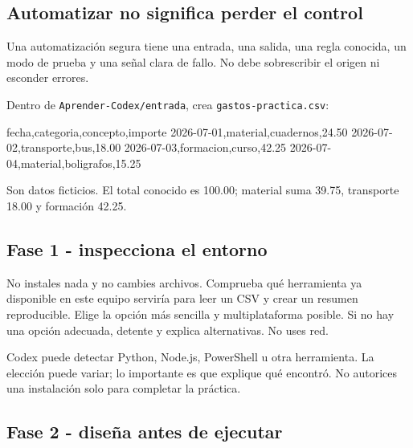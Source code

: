 \documentclass[10pt,a4paper,openany]{book}
\newenvironment{Shaded}{}{}
\newcommand{\NormalTok}[1]{#1}
\renewenvironment{Shaded}
  {\begin{tcolorbox}[
    enhanced,
    breakable,
    colback=CodeBg,
    colframe=Border,
    boxrule=0.5pt,
    arc=2mm,
    left=3mm,
    right=3mm,
    top=2.2mm,
    bottom=2.2mm,
    before skip=0.8em,
    after skip=0.9em
  ]}
  {\end{tcolorbox}}
\begin{document}
\subsection{Automatizar no significa perder el
control}\label{automatizar-no-significa-perder-el-control}

Una automatización segura tiene una entrada, una salida, una regla
conocida, un modo de prueba y una señal clara de fallo. No debe
sobrescribir el origen ni esconder errores.

Dentro de \texttt{Aprender-Codex/entrada}, crea
\texttt{gastos-practica.csv}:

\begin{Shaded}
\begin{Highlighting}[]
\NormalTok{fecha,categoria,concepto,importe}
\NormalTok{2026{-}07{-}01,material,cuadernos,24.50}
\NormalTok{2026{-}07{-}02,transporte,bus,18.00}
\NormalTok{2026{-}07{-}03,formacion,curso,42.25}
\NormalTok{2026{-}07{-}04,material,boligrafos,15.25}
\end{Highlighting}
\end{Shaded}

Son datos ficticios. El total conocido es 100.00; material suma 39.75,
transporte 18.00 y formación 42.25.

\subsection{Fase 1 - inspecciona el
entorno}\label{fase-1---inspecciona-el-entorno}

\begin{Shaded}
\begin{Highlighting}[]
\NormalTok{No instales nada y no cambies archivos. Comprueba qué herramienta ya disponible}
\NormalTok{en este equipo serviría para leer un CSV y crear un resumen reproducible. Elige}
\NormalTok{la opción más sencilla y multiplataforma posible. Si no hay una opción adecuada,}
\NormalTok{detente y explica alternativas. No uses red.}
\end{Highlighting}
\end{Shaded}

Codex puede detectar Python, Node.js, PowerShell u otra herramienta. La
elección puede variar; lo importante es que explique qué encontró. No
autorices una instalación solo para completar la práctica.

\subsection{Fase 2 - diseña antes de
ejecutar}\label{fase-2---diseuxf1a-antes-de-ejecutar}
\end{document}
